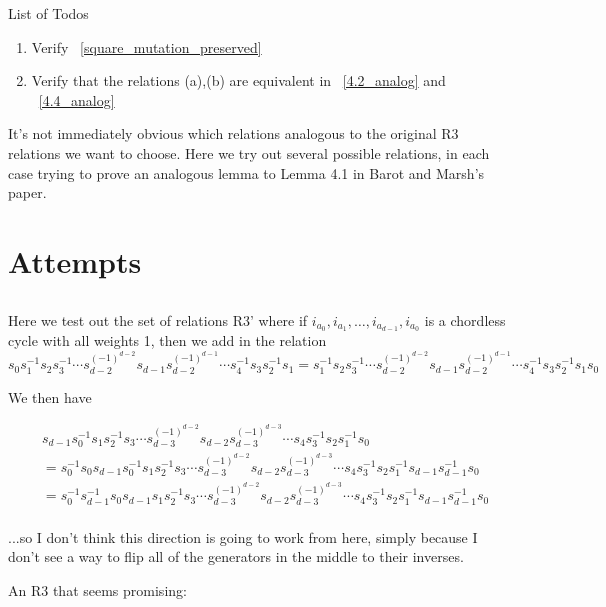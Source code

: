 \documentclass[11pt]{amsart}
\makeatletter
\theoremstyle{definition}
\def\listtodoname{List of Todos}
\def\listoftodos{\@starttoc{tdo}\listtodoname}
\makeatother
\begin{document}
\listoftodos
\begin{enumerate}
	\item Verify ~\ref{square_mutation_preserved}
	\item Verify that the relations (a),(b) are equivalent in ~\ref{4.2_analog} and ~\ref{4.4_analog}
	\end{enumerate}
\newpage

It's not immediately obvious which relations analogous to the original R3 relations we want to choose.  Here we try out several possible relations, in each case trying to prove an analogous lemma to Lemma 4.1 in Barot and Marsh's paper.



\section{Attempts}

\subsection{}
Here we test out the set of relations R3' where if $i_{a_0}, i_{a_1},\ldots,i_{a_{d-1}},i_{a_0}$ is a chordless cycle with all weights 1, then we add in the relation 
$$s_0s_1^{-1}s_2s_3^{-1}\cdots s_{d-2}^{(-1)^{d-2}} s_{d-1}s_{d-2}^{(-1)^{d-1}}\cdots s_4^{-1}s_3s_2^{-1}s_1 = s_1^{-1}s_2s_3^{-1}\cdots s_{d-2}^{(-1)^{d-2}} s_{d-1}s_{d-2}^{(-1)^{d-1}}\cdots s_4^{-1}s_3s_2^{-1}s_1s_0$$


We then have

\begin{align*}
& s_{d-1}s_0^{-1}s_1s_2^{-1}s_3\cdots s_{d-3}^{(-1)^{d-2}} s_{d-2}s_{d-3}^{(-1)^{d-3}}\cdots s_4s_3^{-1}s_2s_1^{-1}s_0\\
&= s_0^{-1}s_0s_{d-1}s_0^{-1}s_1s_2^{-1}s_3\cdots s_{d-3}^{(-1)^{d-2}} s_{d-2}s_{d-3}^{(-1)^{d-3}}\cdots s_4s_3^{-1}s_2s_1^{-1}s_{d-1}s_{d-1}^{-1}s_0\\
&= s_0^{-1}s_{d-1}^{-1}s_0s_{d-1}s_1s_2^{-1}s_3\cdots s_{d-3}^{(-1)^{d-2}} s_{d-2}s_{d-3}^{(-1)^{d-3}}\cdots s_4s_3^{-1}s_2s_1^{-1}s_{d-1}s_{d-1}^{-1}s_0\\
\end{align*}


...so I don't think this direction is going to work from here, simply because I don't see a way to flip all of the generators in the middle to their inverses.

An R3 that seems promising:
\end{document}
